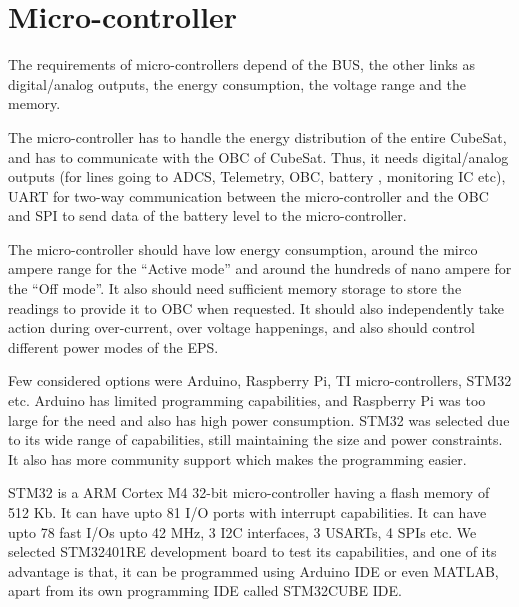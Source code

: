 \pagebreak \justifying
 
 \section{Micro-controller}
 The requirements of micro-controllers depend of the BUS, the other links as digital/analog outputs, the energy consumption, the voltage range and the memory.
 \par
 The micro-controller has to handle the energy distribution of the entire CubeSat, and has to communicate with the OBC of CubeSat. Thus, it needs digital/analog outputs (for lines going to ADCS, Telemetry, OBC, battery , monitoring IC etc), UART for two-way communication between the micro-controller and the OBC and SPI to  send data of the battery level to the micro-controller.
 \par
 The micro-controller should have low energy consumption, around the mirco ampere range for the “Active mode” and around the hundreds of nano ampere for the “Off mode”. It also should need sufficient memory storage to store the readings to provide it to OBC when requested. It should also independently take action during over-current, over voltage happenings, and also should control different power modes of the EPS.
 \par
 Few considered options were Arduino, Raspberry Pi, TI micro-controllers, STM32 etc. Arduino has limited programming capabilities, and Raspberry Pi was too large for the need and also has high power consumption. STM32 was selected due to its wide range of capabilities, still maintaining the size and power constraints. It also has more community support which makes the programming easier.
 \par
 STM32 is a ARM Cortex M4 32-bit micro-controller having a flash memory of 512 Kb. It can have upto 81 I/O ports with interrupt capabilities. It can have upto 78 fast I/Os upto 42 MHz, 3 I2C interfaces, 3 USARTs, 4 SPIs etc. We selected STM32401RE development board to test its capabilities, and one of its advantage is that, it can be programmed using Arduino IDE or even MATLAB, apart from its own programming IDE called STM32CUBE IDE.